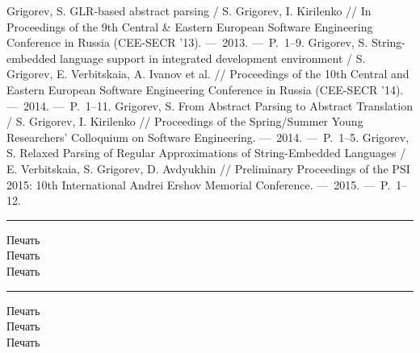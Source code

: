 \renewcommand{\refname}{Публикации автора по теме диссертации в других изданиях}
\begin{thebibliography}{99}
\setcounter{enumiv}{\value{firstbib}}
 Grigorev, S. GLR-based abstract parsing / S. Grigorev, I. Kirilenko // In Proceedings of the 9th Central \& Eastern European Software Engineering Conference in Russia (CEE-SECR ’13). ---~2013. ---~P.~1--9.
 Grigorev, S. String-embedded language support in integrated development environment / S. Grigorev, E. Verbitskaia, A. Ivanov et al. // Proceedings of the 10th Central and Eastern European Software Engineering Conference in Russia (CEE-SECR '14). ---~2014. ---~P.~1--11.
 Grigorev, S. From Abstract Parsing to Abstract Translation / S. Grigorev, I. Kirilenko // Proceedings of the Spring/Summer Young Researchers' Colloquium on Software Engineering. ---~2014. ---~P.~1--5.
 Grigorev, S. Relaxed Parsing of Regular Approximations of String-Embedded Languages / E. Verbitskaia, S. Grigorev, D. Avdyukhin // Preliminary Proceedings of the PSI 2015: 10th International Andrei Ershov Memorial Conference. ---~2015. ---~P.~1--12.

\end{thebibliography}

\vfill
\small
\centering
\hrule
\vspace{2.5pt}
Печать\\
Печать\\
Печать\\
\vspace{2.5pt}
\hrule
\vspace{2.5pt}
Печать\\
Печать\\
Печать\\
